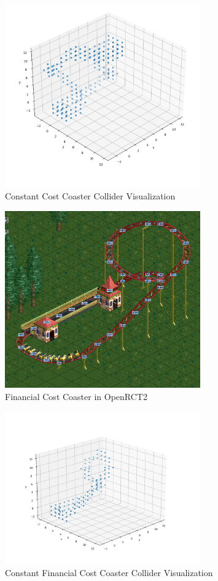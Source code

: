 \documentclass[12pt]{article}
\begin{document}
\begin{figure}[h]
    \caption{Constant Cost Coaster Collider Visualization}
    \centering
    \includegraphics[width=0.75\textwidth]{collider_constantcost}
\end{figure}

\begin{figure}[h]
    \caption{Financial Cost Coaster in OpenRCT2}
    \centering
    \includegraphics[width=0.75\textwidth]{coaster_financialcost}
\end{figure}

\begin{figure}[h]
    \caption{Constant Financial Cost Coaster Collider Visualization}
    \centering
    \includegraphics[width=0.75\textwidth]{collider_financialcost}
\end{figure}
\end{document}
